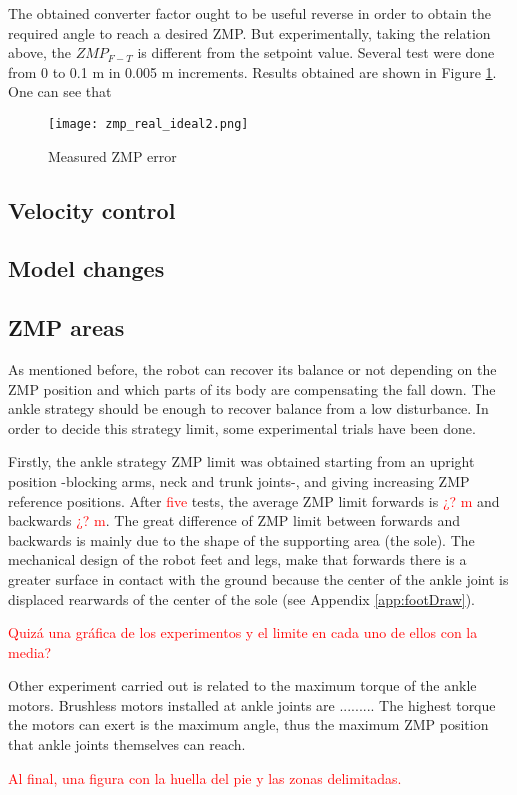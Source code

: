 The obtained converter factor ought to be useful reverse in order to obtain the required angle to reach a desired ZMP. But experimentally, taking the relation above, the $ZMP_{F-T}$ is different from the setpoint value. Several test were done from 0 to 0.1 m in 0.005 m increments. Results obtained are shown in Figure \ref{fig:ZMPerror}. One can see that 



\begin{figure}[!hbt]
\centering
\texttt{[image: zmp\_real\_ideal2.png]}
\caption{Measured ZMP error}
\label{fig:ZMPerror}
\end{figure}

\subsection{Velocity control}

\subsection{Model changes}

\subsection{ZMP areas}
As mentioned before, the robot can recover its balance or not depending on the ZMP position and which parts of its body are compensating the fall down. The ankle strategy should be enough to recover balance from a low disturbance. In order to decide this strategy limit, some experimental trials have been done. 

Firstly, the ankle strategy ZMP limit was obtained starting from an upright position -blocking arms, neck and trunk joints-, and giving increasing ZMP reference positions. After \textcolor{red}{five} tests, the average ZMP limit forwards is \textcolor{red}{¿? m} and backwards \textcolor{red}{¿? m}. The great difference of ZMP limit between forwards and backwards is mainly due to the shape of the supporting area (the sole). The mechanical design of the robot feet and legs, make that forwards there is a greater surface in contact with the ground because the center of the ankle joint is displaced rearwards of the center of the sole (see Appendix \ref{app:footDraw}).

\textcolor{red}{Quizá una gráfica de los experimentos y el limite en cada uno de ellos con la media?}

Other experiment carried out is related to the maximum torque of the ankle motors. Brushless motors installed at ankle joints are ......... The highest torque the motors can exert is the maximum angle, thus the maximum ZMP position that ankle joints themselves can reach.


\textcolor{red}{Al final, una figura con la huella del pie y las zonas delimitadas.}

